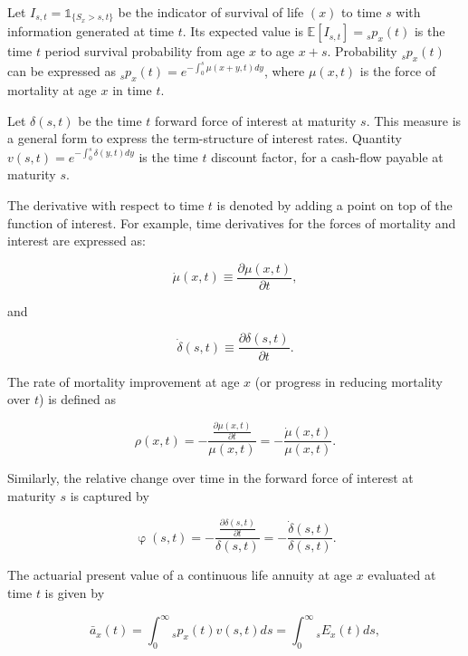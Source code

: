 \documentclass[12pt]{article}
\begin{document}
Let $I_{s,t}=\mathds{1}_{\{S_x>s,t\}}$ be the indicator of survival of life $(x)$ to time $s$ with information generated at time $t$. Its expected value is $\mathbb{E}[I_{s,t}]={}_sp_x(t)$ is the time $t$ period survival probability from age \(x\) to age \(x+s\). Probability ${}_sp_x(t)$ can be expressed as ${}_sp_x(t)=e^{-\int_{0}^{s}\mu(x+y,t)dy}$, where \(\mu(x,t)\) is the force of mortality at age \(x\) in time $t$.

Let \(\delta(s,t)\) be the time $t$ forward force of interest at maturity $s$. This measure is a general form to express the term-structure of interest rates. Quantity ${v}(s,t)=e^{-\int_{0}^{s}\delta(y,t)dy}$ is the time $t$ discount factor, for a cash-flow payable at maturity $s$.

The derivative with respect to time $t$ is denoted by adding a point on top of the function of interest. For example, time derivatives for the forces of mortality and interest are expressed as:

\begin{equation} \label{eq:mudot}
\dot{\mu}(x,t)\equiv\frac{\partial\mu(x,t)}{\partial t},
\end{equation}

and 

\begin{equation} \label{eq:mudot}
\dot{\delta}(s,t)\equiv\frac{\partial\delta(s,t)}{\partial t}.
\end{equation}

The rate of mortality improvement at age \(x\) (or progress in reducing mortality over $t$)  is defined as

\begin{equation} \label{eq:rho}
\rho(x,t)=-\frac{\frac{\partial \mu(x,t)}{\partial t}}{\mu(x,t)} = - \frac{\dot{\mu}(x,t)}{\mu(x,t)}.
\end{equation}

Similarly, the relative change over time in the forward force of interest at maturity $s$ is captured by 

\begin{equation} \label{eq:phi}
\upvarphi(s,t)=-\frac{\frac{\partial \delta(s,t)}{\partial t}}{\delta(s,t)} = -\frac{\dot{\delta}(s,t)}{\delta(s,t)}.
\end{equation}

The actuarial present value of a continuous life annuity at age $x$ evaluated at time $t$ is given by

\begin{equation}\label{eq:Annuity}
\bar{a}_x(t) = \int_0^\infty {}_sp_x(t) {v}(s,t)ds = \int_0^\infty {}_sE_x(t) ds,
\end{equation}
\end{document}
